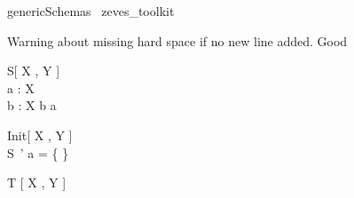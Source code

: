 \begin{zsection}	 \SECTION genericSchemas \parents~zeves\_toolkit
\end{zsection}



Warning about missing hard space if no new line added. Good
\begin{schema}{S}[ X , Y ]
\\
 a : \power X \\
 b : X 
\where
 b \in a
\end{schema}



\begin{schema}{Init}[ X , Y ]
\\
 S~' 
\where
 a = \{ \}
\end{schema}



\begin{zed}T [ X , Y ] 
\end{zed}

